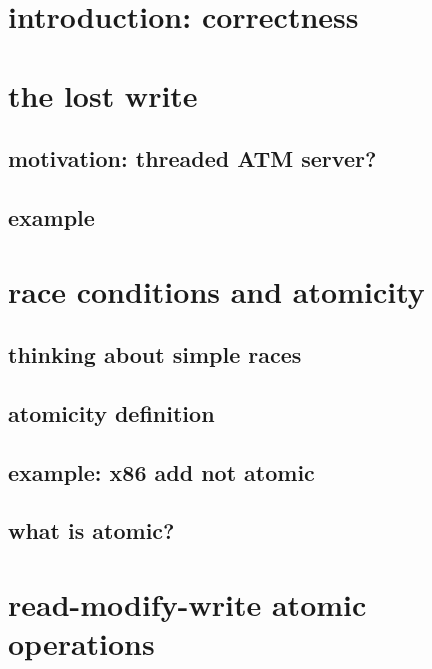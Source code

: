 \section{introduction: correctness}




\section{the lost write}

\subsection{motivation: threaded ATM server?}


\subsection{example}


\section{race conditions and atomicity}
\subsection{thinking about simple races} 


\subsection{atomicity definition}


\subsection{example: x86 add not atomic}


\subsection{what is atomic?}


\section{read-modify-write atomic operations}


